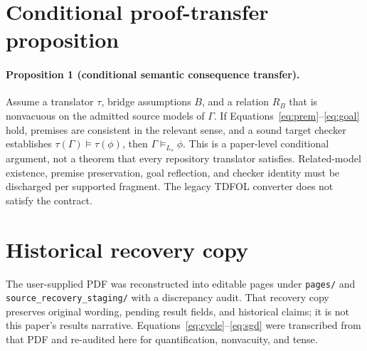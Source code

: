 \documentclass{article}
\begin{document}
\section{Conditional proof-transfer proposition}
\label{app:prop}
\paragraph{Proposition 1 (conditional semantic consequence transfer).}
\label{prop:transfer}
Assume a translator $\tau$, bridge assumptions $B$, and a relation $R_B$ that is nonvacuous on the admitted source models of $\Gamma$. If Equations~\ref{eq:prem}--\ref{eq:goal} hold, premises are consistent in the relevant sense, and a sound target checker establishes $\tau(\Gamma)\models\tau(\phi)$, then $\Gamma\models_{L_s}\phi$.
This is a paper-level conditional argument, not a theorem that every repository translator satisfies. Related-model existence, premise preservation, goal reflection, and checker identity must be discharged per supported fragment. The legacy TDFOL converter does not satisfy the contract.

\section{Historical recovery copy}
\label{app:recovery}
The user-supplied PDF was reconstructed into editable pages under \texttt{pages/} and \texttt{source\_recovery\_staging/} with a discrepancy audit. That recovery copy preserves original wording, pending result fields, and historical claims; it is not this paper's results narrative. Equations~\ref{eq:cycle}--\ref{eq:sgd} were transcribed from that PDF and re-audited here for quantification, nonvacuity, and tense.
\end{document}
